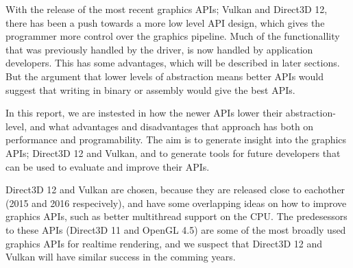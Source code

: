 With the release of the most recent graphics \glspl{API}; Vulkan and Direct3D 12, there has been a push towards a more low level API design, which gives the programmer more control over the graphics pipeline.
Much of the functionallity that was previously handled by the driver, is now handled by application developers. 
This has some advantages, which will be described in later sections. 
But the argument that lower levels of abstraction means better \glspl{API} would suggest that writing in binary or assembly would give the best \glspl{API}.

In this report, we are instested in how the newer \glspl{API} lower their abstraction-level, and what advantages and disadvantages that approach has both on performance and programability.
The aim is to generate insight into the graphics \glspl{API}; Direct3D 12 and Vulkan, and to generate tools for future developers that can be used to evaluate and improve their \glspl{API}.

Direct3D 12 and Vulkan are chosen, because they are released close to eachother (2015 and 2016 respecively), and have some overlapping ideas on how to improve graphics \glspl{API}, such as better multithread support on the CPU.
The predesessors to these \glspl{API} (Direct3D 11 and OpenGL 4.5) are some of the most broadly used graphics \glspl{API} for realtime rendering, and we suspect that Direct3D 12 and Vulkan will have similar success in the comming years.






